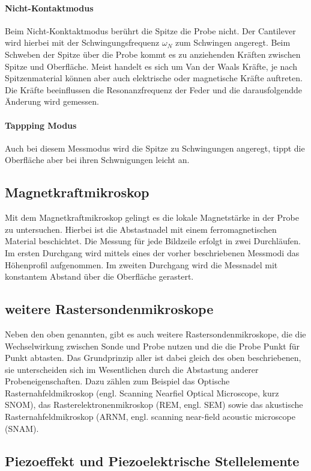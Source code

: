 \documentclass[a4paper,twoside,final]{article}
\begin{document}
\paragraph{Nicht-Kontaktmodus}
Beim Nicht-Konktaktmodus berührt die Spitze die Probe nicht. Der Cantilever wird hierbei mit der Schwingungsfrequenz $\omega_N$ zum Schwingen angeregt. Beim Schweben der Spitze über die Probe kommt es zu anziehenden Kräften zwischen Spitze und Oberfläche. Meist handelt es sich um Van der Waals Kräfte, je nach Spitzenmaterial können aber auch elektrische oder magnetische Kräfte auftreten. Die Kräfte beeinflussen die Resonanzfrequenz der Feder und die darausfolgendde Änderung wird gemessen.

\paragraph{Tappping Modus}
Auch bei diesem Messmodus wird die Spitze zu Schwingungen angeregt, tippt die Oberfläche aber bei ihren Schwnigungen leicht an.

\subsection{Magnetkraftmikroskop}
Mit dem Magnetkraftmikroskop gelingt es die lokale Magnetstärke in der Probe zu untersuchen. Hierbei ist die Abstastnadel mit einem ferromagnetischen Material beschichtet. Die Messung für jede Bildzeile erfolgt in zwei Durchläufen. Im ersten Durchgang wird mittels eines der vorher beschriebenen Messmodi das Höhenprofil aufgenommen. Im zweiten Durchgang wird die Messnadel mit konstantem Abstand über die Oberfläche gerastert.

\subsection{weitere Rastersondenmikroskope}
Neben den oben genannten, gibt es auch weitere  Rastersondenmikroskope, die die Wechselwirkung zwischen Sonde und Probe nutzen und die die Probe Punkt für Punkt abtasten. Das Grundprinzip aller ist dabei gleich des oben beschriebenen, sie unterscheiden sich im Wesentlichen durch die Abstastung anderer Probeneigenschaften. Dazu zählen zum Beispiel das Optische Rasternahfeldmikroskop (engl. Scanning Nearfiel Optical Microscope, kurz SNOM), das Rasterelektronenmikroskop (REM, engl. SEM) sowie das akustische Rasternahfeldmikroskop (ARNM, engl. scanning near-field acoustic microscope (SNAM).
\subsection{Piezoeffekt und Piezoelektrische Stellelemente}
\newpage
\end{document}
